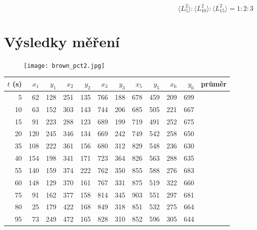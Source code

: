 \documentclass[a4paper,11pt]{article}
\begin{document}
\begin{equation*}
 \langle L_5^2 \rangle : \langle L_{10}^2 \rangle : \langle L_{15}^2 \rangle = 1 : 2 : 3
\end{equation*}

\newpage

\section{Výsledky měření}

\begin{figure}[htpb]
    \centering
    \texttt{[image: brown\_pct2.jpg]}
    \caption{}
\end{figure}

\begin{table}[htpb]
    \centering
    \scriptsize
    \begin{tabular}{c | r r | r r | r r | r r | r r | c}
        \multicolumn{1}{r|}{$ t $ (s)} & $ x_1 $ & $ y_1 $ & $ x_2 $ & $ y_2 $ & $ x_3 $ & $ y_3 $ & $ x_5 $ & $ y_5 $ & $ x_6 $ & $ y_6 $ & průměr  \\
        \hline\hline
       \multicolumn{1}{r|}{  5} & 62  & 128 & 251 & 135 & 766 & 188 & 678 & 459 & 209 & 699 &  \\
       \multicolumn{1}{r|}{ 10} & 63  & 152 & 303 & 143 & 744 & 206 & 685 & 505 & 221 & 667 &  \\
       \multicolumn{1}{r|}{ 15} & 91  & 223 & 288 & 123 & 689 & 199 & 719 & 491 & 252 & 675 &  \\
       \multicolumn{1}{r|}{ 20} & 120 & 245 & 346 & 134 & 669 & 242 & 749 & 542 & 258 & 650 &  \\
       \multicolumn{1}{r|}{ 35} & 108 & 222 & 361 & 156 & 680 & 312 & 829 & 548 & 236 & 630 &  \\
       \multicolumn{1}{r|}{ 40} & 154 & 198 & 341 & 171 & 723 & 364 & 826 & 563 & 288 & 635 &  \\
       \multicolumn{1}{r|}{ 55} & 140 & 159 & 374 & 222 & 762 & 350 & 855 & 588 & 276 & 683 &  \\
       \multicolumn{1}{r|}{ 60} & 148 & 129 & 370 & 161 & 767 & 331 & 875 & 519 & 322 & 660 &  \\
       \multicolumn{1}{r|}{ 75} & 91  & 162 & 377 & 158 & 814 & 345 & 903 & 551 & 297 & 681 &  \\
       \multicolumn{1}{r|}{ 80} & 25  & 179 & 422 & 168 & 849 & 318 & 851 & 532 & 275 & 664 &  \\
       \multicolumn{1}{r|}{ 95} & 73  & 249 & 472 & 165 & 828 & 310 & 852 & 596 & 305 & 644 &  \\

\end{tabular}
\end{table}
\end{document}
